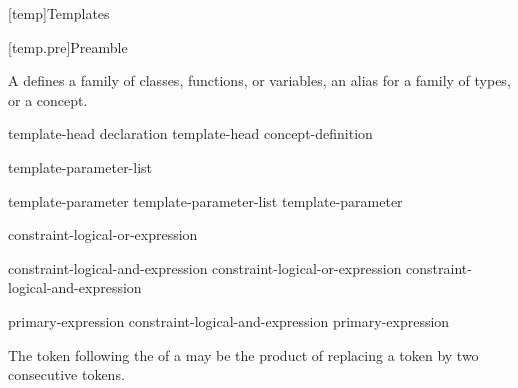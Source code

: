 [temp]{Templates}%


%

[temp.pre]{Preamble}

\pnum
A  defines a family of classes, functions, or variables,
an alias for a family of types, or a concept.

%
%
\begin{bnf}
\br
  template-head declaration\br
  template-head concept-definition
\end{bnf}

\begin{bnf}
\br
   \terminal{<} template-parameter-list \terminal{>} 
\end{bnf}

\begin{bnf}
\br
  template-parameter\br
  template-parameter-list \terminal{,} template-parameter
\end{bnf}

\begin{bnf}
\br
   constraint-logical-or-expression
\end{bnf}

\begin{bnf}
\br
  constraint-logical-and-expression\br
  constraint-logical-or-expression \terminal{||} constraint-logical-and-expression
\end{bnf}

\begin{bnf}
\br
  primary-expression\br
  constraint-logical-and-expression \terminal{\&\&} primary-expression
\end{bnf}

\begin{note}
The \tcode{>} token following the
 of a
may be the product of replacing a
\tcode{>{>}} token by two consecutive \tcode{>}
tokens.
\end{note}


